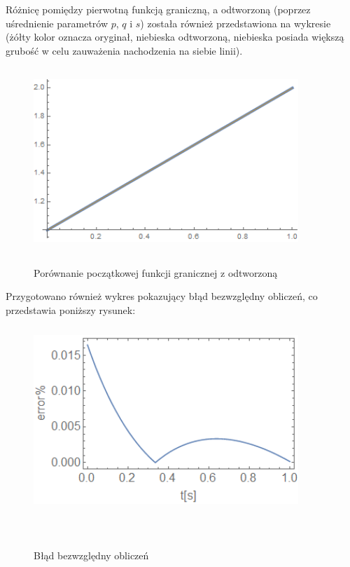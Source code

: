 \documentclass[twoside]{projektInzynierskiMS1}
\newcommand{\si}{ś}
\begin{document}
Różnicę pomiędzy pierwotną funkcją graniczną, a odtworzoną (poprzez u\si rednienie parametrów $p$, $q$ i $s$) została również przedstawiona na wykresie (żółty kolor oznacza oryginał, niebieska odtworzoną, niebieska posiada większą grubo\si ć w celu zauważenia nachodzenia na siebie linii).

\begin{figure}[H]
\begin{center}
		\includegraphics[height=7cm, width=10cm]{0reconstruction.png}\\
	\caption{Porównanie początkowej funkcji granicznej z odtworzoną}
\end{center}
\end{figure}

Przygotowano również wykres pokazujący błąd bezwzględny obliczeń, co przedstawia poniższy rysunek: \\

\begin{figure}[H]
\begin{center}
		\includegraphics[height=7cm, width=10cm]{0abs.png}\\
	\caption{Błąd bezwzględny obliczeń}\
\end{center}
\end{figure}
\end{document}
